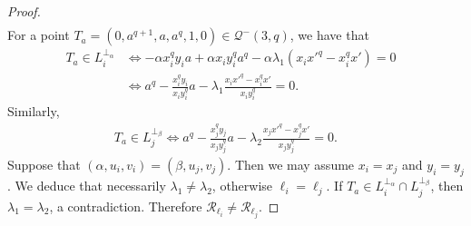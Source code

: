 \documentclass[11pt]{article}
\theoremstyle{definition}
\numberwithin{equation}{section}
\def\cQ{\mathcal Q}
\def\cR{\mathcal R}
\begin{document}
\begin{proof}
\begin{align*}
\end{align*}
For a point $T_a = (0, a^{q+1}, a, a^q, 1, 0) \in \cQ^-(3, q)$, we have that 
\begin{align*}
T_a \in L_i^{\perp_{\alpha}} & \iff - \alpha x_i^q y_i a + \alpha x_i y_i^q a^q - \alpha \lambda_1 \left(x_i x'^q - x_i^q x'\right) = 0 & \\
& \iff a^q - \frac{x_i^q y_i}{x_i y_i^q} a - \lambda_1 \frac{x_i x'^q - x_i^q x'}{x_i y_i^q} = 0.
\end{align*}
Similarly, 
\begin{align*}
T_a \in L_{j}^{\perp_{\beta}} \iff a^q - \frac{x_{j}^q y_{j}}{x_{j} y_{j}^q} a - \lambda_2 \frac{x_{j} x'^q - x_{j}^q x'}{x_{j} y_{j}^q} = 0. && 
\end{align*}
Suppose that $(\alpha, u_i, v_i) = (\beta, u_{j}, v_{j})$. Then we may assume $x_i = x_{j}$ and $y_i = y_{j}$. We deduce that necessarily $\lambda_1 \ne \lambda_2$, otherwise $\ell_i = \ell_j$. If $T_a \in L_i^{\perp_{\alpha}} \cap L_{j}^{\perp_{\beta}}$, then $\lambda_1 = \lambda_2$, a contradiction. Therefore  
$\cR_{\ell_i} \ne \cR_{\ell_j}$.



\end{proof}
\end{document}
